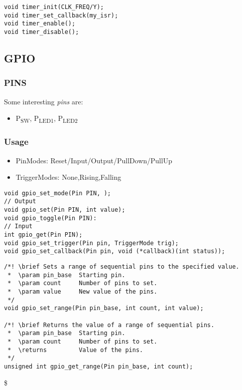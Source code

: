 \documentclass[11pt]{article}
\begin{document}
\begin{verbatim}
void timer_init(CLK_FREQ/Y);
void timer_set_callback(my_isr);
void timer_enable();
void timer_disable();
\end{verbatim}
\subsection{GPIO}
\label{sec:org6475661}
\subsubsection{PINS}
\label{sec:orgb524c9f}
Some interesting \emph{pins} are:
\begin{itemize}
\item P\textsubscript{SW}, P\textsubscript{LED1}, P\textsubscript{LED2}
\end{itemize}
\subsubsection{Usage}
\label{sec:orgff04e24}
\begin{itemize}
\item PinModes: Reset/Input/Output/PullDown/PullUp
\item TriggerModes: None,Rising,Falling
\end{itemize}
\begin{verbatim}
void gpio_set_mode(Pin PIN, );
// Output
void gpio_set(Pin PIN, int value);
void gpio_toggle(Pin PIN):
// Input
int gpio_get(Pin PIN);
void gpio_set_trigger(Pin pin, TriggerMode trig);
void gpio_set_callback(Pin pin, void (*callback)(int status));
\end{verbatim}

\begin{verbatim}
/*! \brief Sets a range of sequential pins to the specified value.
 *  \param pin_base  Starting pin.
 *  \param count     Number of pins to set.
 *  \param value     New value of the pins.
 */
void gpio_set_range(Pin pin_base, int count, int value);

/*! \brief Returns the value of a range of sequential pins.
 *  \param pin_base  Starting pin.
 *  \param count     Number of pins to set.
 *  \returns         Value of the pins.
 */
unsigned int gpio_get_range(Pin pin_base, int count);
\end{verbatim}

\$
\end{document}
